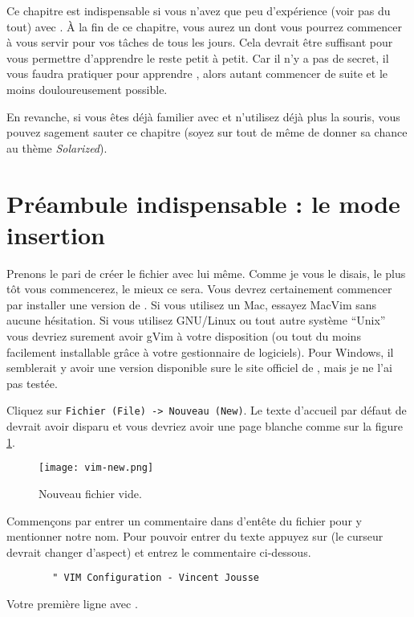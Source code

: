 Ce chapitre est indispensable si vous n'avez que peu d'expérience (voir pas du tout) avec \vim. À la fin de ce chapitre, vous aurez un \vim dont vous pourrez commencer à vous servir pour vos tâches de tous les jours. Cela devrait être suffisant pour vous permettre d'apprendre le reste petit à petit. Car il n'y a pas de secret, il vous faudra pratiquer pour apprendre \vim, alors autant commencer de suite et le moins douloureusement possible.

En revanche, si vous êtes déjà familier avec \vim et n'utilisez déjà plus la souris, vous pouvez sagement sauter ce chapitre (soyez sur tout de même de donner sa chance au thème \emph{Solarized}).

\section{Préambule indispensable : le mode insertion}

Prenons le pari de créer le fichier \vimrc avec \vim lui même. Comme je vous le disais, le plus tôt vous commencerez, le mieux ce sera.
Vous devrez certainement commencer par installer une version de \vim. Si vous utilisez un Mac, essayez MacVim  sans aucune hésitation. Si vous utilisez GNU/Linux ou tout autre système ``Unix'' vous devriez surement avoir gVim à votre disposition (ou tout du moins facilement installable grâce à votre gestionnaire de logiciels). Pour Windows, il semblerait y avoir une version disponible sure le site officiel de \vim{}, mais je ne l'ai pas testée.

Cliquez sur \Verb|Fichier (File) -> Nouveau (New)|. Le texte d'accueil par défaut de \vim devrait avoir disparu et vous devriez avoir une page blanche comme sur la figure \ref{fig:vim-new}. 

\begin{figure}%
  \texttt{[image: vim-new.png]}
  \caption{Nouveau fichier vide.}
  \label{fig:vim-new}
\end{figure}

Commençons par entrer un commentaire dans d'entête du fichier pour y mentionner notre nom. Pour pouvoir entrer du texte appuyez sur \tti (le curseur devrait changer d'aspect) et entrez le commentaire ci-dessous.
\begin{listing}[H]

    \begin{verbatim}
        " VIM Configuration - Vincent Jousse
    \end{verbatim}
    \caption{Votre première ligne avec \vim.}
    \label{code:first-comment}
\end{listing}

